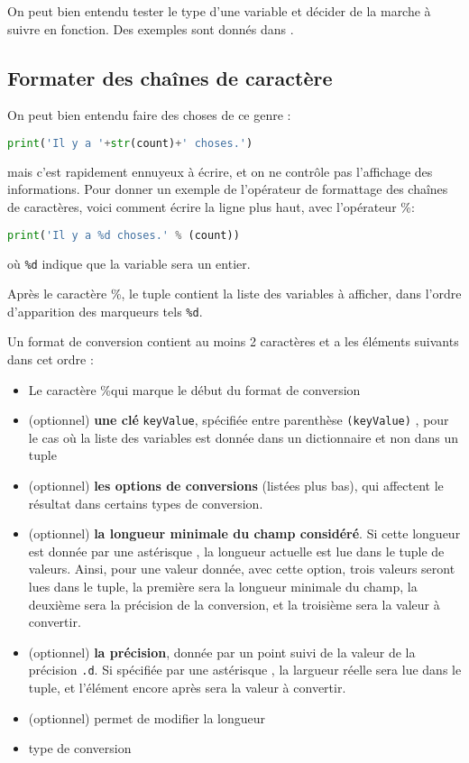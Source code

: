 \documentclass[a4paper,twoside]{article}
\begin{document}
\bigskip

On peut bien entendu tester le type d'une variable et décider de la marche à suivre en fonction. Des exemples sont donnés dans .

\subsection{Formater des chaînes de caractère}
On peut bien entendu faire des choses de ce genre : 
\begin{lstlisting}[language=python]
print('Il y a '+str(count)+' choses.')
\end{lstlisting}
mais c'est rapidement ennuyeux à écrire, et on ne contrôle pas l'affichage des informations. Pour donner un exemple de l'opérateur de formattage des chaînes de caractères, voici comment écrire la ligne plus haut, avec l'opérateur \og\%\fg :
\begin{lstlisting}[language=python]
print('Il y a %d choses.' % (count))
\end{lstlisting}
où \texttt{\%d} indique que la variable sera un entier.

\begin{remarque}
Après le caractère \og\%\fg, le tuple contient la liste des variables à afficher, dans l'ordre d'apparition des marqueurs tels \texttt{\%d}.
\end{remarque}

Un format de conversion contient au moins 2 caractères et a les éléments suivants dans cet ordre :
\begin{itemize}
\item Le caractère \og\%\fg qui marque le début du format de conversion
\item (optionnel) \textbf{une clé} \texttt{keyValue}, spécifiée entre parenthèse \texttt{(keyValue)} , pour le cas où la liste des variables est donnée dans un dictionnaire et non dans un tuple
\item (optionnel) \textbf{les options de conversions} (listées plus bas), qui affectent le résultat dans certains types de conversion.
\item (optionnel) \textbf{la longueur minimale du champ considéré}. Si cette longueur est donnée par une astérisque \og *\fg, la longueur actuelle est lue dans le tuple de valeurs. Ainsi, pour une valeur donnée, avec cette option, trois valeurs seront lues dans le tuple, la première sera la longueur minimale du champ, la deuxième sera la précision de la conversion, et la troisième sera la valeur à convertir.
\item (optionnel) \textbf{la précision}, donnée par un point suivi de la valeur de la précision \texttt{.d}. Si spécifiée par une astérisque \og * \fg, la largueur réelle sera lue dans le tuple, et l'élément encore après sera la valeur à convertir.
\item (optionnel) permet de modifier la longueur
\item type de conversion
\end{itemize}
\end{document}

